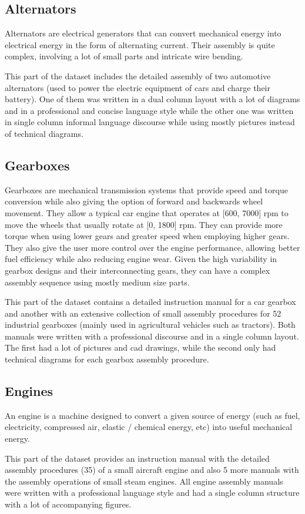 \subsection{Alternators}

Alternators are electrical generators that can convert mechanical energy into electrical energy in the form of alternating current. Their assembly is quite complex, involving a lot of small parts and intricate wire bending.

This part of the dataset includes the detailed assembly of two automotive alternators (used to power the electric equipment of cars and charge their battery). One of them was written in a dual column layout with a lot of diagrams and in a professional and concise language style while the other one was written in single column informal language discourse while using mostly pictures instead of technical diagrams.


\subsection{Gearboxes}

Gearboxes are mechanical transmission systems that provide speed and torque conversion while also giving the option of forward and backwards wheel movement. They allow a typical car engine that operates at [600, 7000] \gls{rpm} to move the wheels that usually rotate at [0, 1800] \gls{rpm}. They can provide more torque when using lower gears and greater speed when employing higher gears. They also give the user more control over the engine performance, allowing better fuel efficiency while also reducing engine wear. Given the high variability in gearbox designs and their interconnecting gears, they can have a complex assembly sequence using mostly medium size parts.

This part of the dataset contains a detailed instruction manual for a car gearbox and another with an extensive collection of small assembly procedures for 52 industrial gearboxes (mainly used in agricultural vehicles such as tractors). Both manuals were written with a professional discourse and in a single column layout. The first had a lot of pictures and \gls{cad} drawings, while the second only had technical diagrams for each gearbox assembly procedure.


\subsection{Engines}

An engine is a machine designed to convert a given source of energy (such as fuel, electricity, compressed air, elastic / chemical energy, etc) into useful mechanical energy.

This part of the dataset provides an instruction manual with the detailed assembly procedures (35) of a small aircraft engine and also 5 more manuals with the assembly operations of small steam engines. All engine assembly manuals were written with a professional language style and had a single column structure with a lot of accompanying figures.
